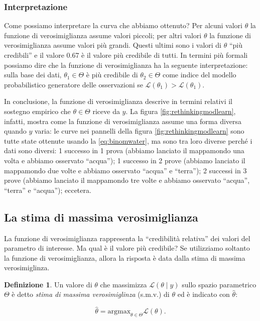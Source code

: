 \documentclass[
]{memoir}
\theoremstyle{definition}
\newtheorem{definition}{Definizione}[chapter]
\theoremstyle{definition}
\theoremstyle{definition}
\theoremstyle{definition}
\theoremstyle{remark}
\begin{document}
\hypertarget{interpretazione}{%
\subsubsection{Interpretazione}\label{interpretazione}}

Come possiamo interpretare la curva che abbiamo ottenuto? Per alcuni valori \(\theta\) la funzione di verosimiglianza assume valori piccoli; per altri valori \(\theta\) la funzione di verosimiglianza assume valori più grandi. Questi ultimi sono i valori di \(\theta\) ``più credibili'' e il valore 0.67 è il valore più credibile di tutti. In termini più formali possiamo dire che la funzione di verosimiglianza ha la seguente interpretazione: sulla base dei dati, \(\theta_1 \in \Theta\) è più credibile di \(\theta_2 \in \Theta\) come indice del modello probabilistico generatore delle osservazioni se \(\mathcal{L}(\theta_1) > \mathcal{L}(\theta_1)\).

In conclusione, la funzione di verosimiglianza descrive in termini relativi il sostegno empirico che \(\theta \in \Theta\) riceve da \(y\). La figura \ref{fig:rethinkingmodlearn}, infatti, mostra come la funzione di verosimiglianza assume una forma diversa quando \(y\) varia: le curve nei pannelli della figura \ref{fig:rethinkingmodlearn} sono tutte state ottenute usando la \eqref{eq:binomwater}, ma sono tra loro diverse perché i dati sono diversi: 1 successo in 1 prova (abbiamo lanciato il mappamondo una volta e abbiamo osservato ``acqua''); 1 successo in 2 prove (abbiamo lanciato il mappamondo due volte e abbiamo osservato ``acqua'' e ``terra''); 2 successi in 3 prove (abbiamo lanciato il mappamondo tre volte e abbiamo osservato ``acqua'', ``terra'' e ``acqua''); eccetera.

\hypertarget{la-stima-di-massima-verosimiglianza}{%
\subsection{La stima di massima verosimiglianza}\label{la-stima-di-massima-verosimiglianza}}

La funzione di verosimiglianza rappresenta la ``credibilità relativa'' dei valori del parametro di interesse. Ma qual è il valore più credibile? Se utilizziamo soltanto la funzione di verosimiglianza, allora la risposta è data dalla stima di massima verosimiglinza.

\begin{definition}
Un valore di \(\theta\) che massimizza \(\mathcal{L}(\theta \mid y)\) sullo spazio parametrico \(\Theta\) è detto \emph{stima di massima verosimiglinza} (s.m.v.) di \(\theta\) ed è indicato con \(\hat{\theta}\):

\begin{equation}
\hat{\theta} = \text{argmax}_{\theta \in \Theta} \mathcal{L}(\theta).
\end{equation}
\end{definition}
\end{document}
